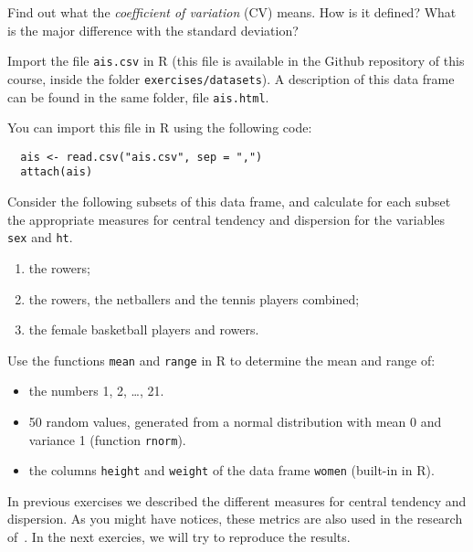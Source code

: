 \begin{exercise}
  Find out what the \emph{coefficient of variation} (CV) means. How is it defined? What is the major difference with the standard deviation?
\end{exercise}

\begin{exercise}
  \label{ex:ais}
  Import the file \texttt{ais.csv} in R (this file is available in the Github repository of this course, inside the folder \texttt{exercises/datasets}). 
  A description of this data frame can be found in the same folder, file \texttt{ais.html}.

  You can import this file in R using the following code:
  \begin{lstlisting}
  ais <- read.csv("ais.csv", sep = ",")
  attach(ais)
  \end{lstlisting}

  Consider the following subsets of this data frame, and calculate for each subset the appropriate measures for central tendency and dispersion for the variables \texttt{sex} and \texttt{ht}.

  \begin{enumerate}
      \item the rowers;
      \item the rowers, the netballers and the tennis players combined;
      \item the female basketball players and rowers.
  \end{enumerate}
\end{exercise}

\begin{exercise}
  \label{ex:mean-range-R}
  Use the functions \texttt{mean} and \texttt{range} in R to determine the mean and range of:
  \begin{itemize}
      \item the numbers 1, 2, \dots, 21.
      \item 50 random values, generated from a normal distribution with mean 0 and variance 1 (function \texttt{rnorm}).
      \item the columns \texttt{height} and \texttt{weight} of the data frame \texttt{women} (built-in in R).
  \end{itemize}
\end{exercise}


In previous exercises we described the different measures for central tendency and dispersion.
As you might have notices, these metrics are also used in the research of~\textcite{Akin2016}.
In the next exercies, we will try to reproduce the results.


